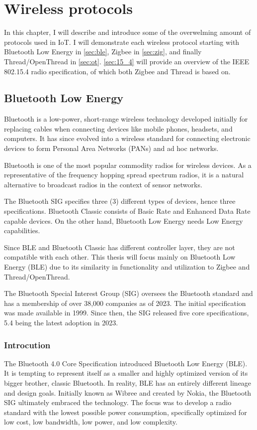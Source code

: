 \chapter{Wireless protocols}
\label{chap:wireless}

In this chapter, I will describe and introduce some of the overwelming amount of protocols used in IoT.
I will demonstrate each wireless protocol starting with Bluetooth Low Energy in \autoref{sec:ble},
Zigbee in \autoref{sec:zig}, and finally Thread/OpenThread in \autoref{sec:ot}.
\autoref{sec:15_4} will provide an overview of the IEEE 802.15.4 radio specification, of which both Zigbee and Thread is based on.

\section{Bluetooth Low Energy}
\label{sec:ble}

Bluetooth is a low-power, short-range wireless technology developed initially for replacing cables when connecting devices like mobile phones, headsets, and computers. It has since evolved into a wireless standard for connecting electronic devices to form Personal Area Networks (PANs) and ad hoc networks. \cite{Dideles03}

Bluetooth is one of the most popular commodity radios for wireless devices.
As a representative of the frequency hopping spread spectrum radios,
it is a natural alternative to broadcast radios in the context of sensor networks. \cite{Leopold03}

The Bluetooth SIG specifies three (3) different types of devices, hence three specifications.
Bluetooth Classic consists of Basic Rate and Enhanced Data Rate capable devices.
On the other hand, Bluetooth Low Energy needs Low Energy capabilities.

Since BLE and Bluetooth Classic has different controller layer, they are not compatible with each other.
This thesis will focus mainly on Bluetooth Low Energy (BLE) due to its
similarity in functionality and utilization to Zigbee and Thread/OpenThread.


The Bluetooth Special Interest Group (SIG) oversees
the Bluetooth standard and has a membership of over 38,000 companies as of 2023. \cite{bt_history}
The initial specification was made available in 1999.
Since then, the SIG released five core specifications, 5.4 being the latest adoption in 2023. \cite{bt_spec_history}

\subsection{Introcution}
\label{ble:int}
The Bluetooth 4.0 Core Specification introduced Bluetooth Low Energy (BLE).
It is tempting to represent itself as a smaller and highly optimized version of
its bigger brother, classic Bluetooth. In reality, BLE has an entirely different lineage and design goals.
Initially known as Wibree and created by Nokia, the Bluetooth SIG ultimately embraced the technology.
The focus was to develop a radio standard with the lowest possible power consumption,
specifically optimized for low cost, low bandwidth, low power, and low complexity. \cite{Townsend14}

